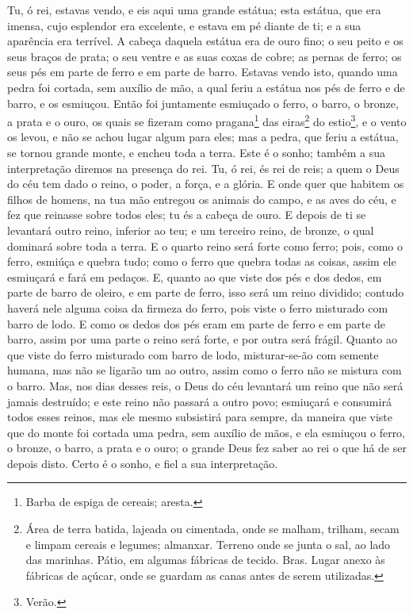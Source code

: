 Tu, ó rei, estavas vendo, e eis aqui uma grande estátua; esta
estátua, que era imensa, cujo esplendor era excelente, e estava em
pé diante de ti; e a sua aparência era terrível. A cabeça
daquela estátua era de ouro fino; o seu peito e os seus braços de
prata; o seu ventre e as suas coxas de cobre; as pernas de
ferro; os seus pés em parte de ferro e em parte de barro.
Estavas vendo isto, quando uma pedra foi cortada, sem auxílio
de mão, a qual feriu a estátua nos pés de ferro e de barro, e os
esmiuçou. Então foi juntamente esmiuçado o ferro, o barro, o
bronze, a prata e o ouro, os quais se fizeram como
pragana\footnote{Barba de espiga de cereais; aresta.} das
eiras\footnote{Área de terra batida, lajeada ou cimentada, onde se
malham, trilham, secam e limpam cereais e legumes; almanxar. Terreno
onde se junta o sal, ao lado das marinhas. Pátio, em algumas
fábricas de tecido. Bras. Lugar anexo às fábricas de açúcar, onde se
guardam as canas antes de serem utilizadas.} do
estio\footnote{Verão.}, e o vento os levou, e não se achou lugar
algum para eles; mas a pedra, que feriu a estátua, se tornou grande
monte, e encheu toda a terra. Este é o sonho; também a sua
interpretação diremos na presença do rei. Tu, ó rei, és rei
de reis; a quem o Deus do céu tem dado o reino, o poder, a força, e
a glória. E onde quer que habitem os filhos de homens, na tua
mão entregou os animais do campo, e as aves do céu, e fez que
reinasse sobre todos eles; tu és a cabeça de ouro. E depois
de ti se levantará outro reino, inferior ao teu; e um terceiro
reino, de bronze, o qual dominará sobre toda a terra. E o
quarto reino será forte como ferro; pois, como o ferro, esmiúça e
quebra tudo; como o ferro que quebra todas as coisas, assim ele
esmiuçará e fará em pedaços. E, quanto ao que viste dos pés e
dos dedos, em parte de barro de oleiro, e em parte de ferro, isso
será um reino dividido; contudo haverá nele alguma coisa da firmeza
do ferro, pois viste o ferro misturado com barro de lodo. E
como os dedos dos pés eram em parte de ferro e em parte de barro,
assim por uma parte o reino será forte, e por outra será frágil.
Quanto ao que viste do ferro misturado com barro de lodo,
misturar-se-ão com semente humana, mas não se ligarão um ao outro,
assim como o ferro não se mistura com o barro. Mas, nos dias
desses reis, o Deus do céu levantará um reino que não será jamais
destruído; e este reino não passará a outro povo; esmiuçará e
consumirá todos esses reinos, mas ele mesmo subsistirá para sempre,
da maneira que viste que do monte foi cortada uma pedra, sem
auxílio de mãos, e ela esmiuçou o ferro, o bronze, o barro, a prata
e o ouro; o grande Deus fez saber ao rei o que há de ser depois
disto. Certo é o sonho, e fiel a sua interpretação.

